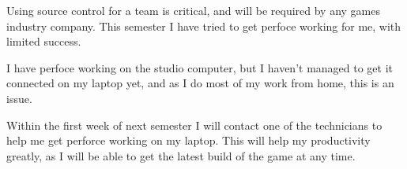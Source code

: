 \documentclass{scrartcl}
\begin{document}
Using source control for a team is critical, and will be required by any games industry company.
This semester I have tried to get perfoce working for me, with limited success.

I have perfoce working on the studio computer, but I haven't managed to get it connected on my laptop yet, and as I do most of my work from home, this is an issue.


Within the first week of next semester I will contact one of the technicians to help me get perforce working on my laptop. This will help my productivity greatly, as I will be able to get the latest build of the game at any time.

\par






%
\end{document}
